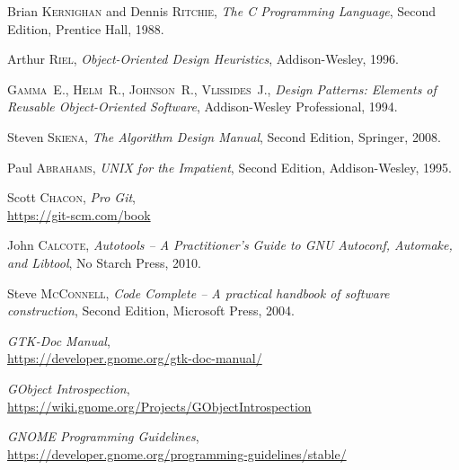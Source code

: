 \begin{thebibliography}{10}

Brian \textsc{Kernighan} and Dennis \textsc{Ritchie},
\emph{The C Programming Language},
Second Edition, Prentice Hall, 1988.

\medskip
{}
Arthur \textsc{Riel},
\emph{Object-Oriented Design Heuristics},
Addison-Wesley, 1996.

\medskip
{}
\textsc{Gamma}~E., \textsc{Helm}~R., \textsc{Johnson}~R., \textsc{Vlissides}~J.,
\emph{Design Patterns: Elements of Reusable Object-Oriented Software},
Addison-Wesley Professional, 1994.

\medskip
{}
Steven \textsc{Skiena},
\emph{The Algorithm Design Manual},
Second Edition, Springer, 2008.

\medskip
{}
Paul \textsc{Abrahams},
\emph{UNIX for the Impatient},
Second Edition, Addison-Wesley, 1995.

\medskip
{}
Scott \textsc{Chacon},
\emph{Pro Git},\\
\url{https://git-scm.com/book}

\medskip
{}
John \textsc{Calcote},
\emph{Autotools -- A Practitioner's Guide to GNU Autoconf, Automake, and Libtool},
No Starch Press, 2010.

\medskip
{}
Steve \textsc{McConnell},
\emph{Code Complete -- A practical handbook of software construction},
Second Edition, Microsoft Press, 2004.

\medskip
{}
\emph{GTK-Doc Manual},\\
\url{https://developer.gnome.org/gtk-doc-manual/}

\medskip
{}
\emph{GObject Introspection},\\
\url{https://wiki.gnome.org/Projects/GObjectIntrospection}

\medskip
{}
\emph{GNOME Programming Guidelines},\\
\url{https://developer.gnome.org/programming-guidelines/stable/}

\end{thebibliography}